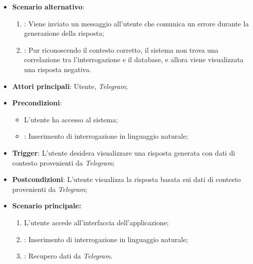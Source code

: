 \begin{itemize}
\begin{itemize}
    \end{itemize}
    \item \textbf{Scenario alternativo}:
    \begin{enumerate}
        \item {}: Viene inviato un messaggio all'utente che comunica un errore durante la generazione della risposta;
        \item {}: Pur riconoscendo il contesto corretto, il sistema non trova una correlazione tra l'interrogazione e il database, e allora viene visualizzata una risposta negativa.
    \end{enumerate}
\end{itemize}

\hypertarget{UC10.1}{}
\begin{itemize}
    \item \textbf{Attori principali}: Utente, \emph{Telegram};
    \item \textbf{Precondizioni}: 
    \begin{itemize}
        \item L'utente ha accesso al sistema;
        \item {}: Inserimento di interrogazione in linguaggio naturale;
    \end{itemize}
    \item \textbf{Trigger}: L'utente desidera visualizzare una risposta generata con dati di contesto provenienti da \emph{Telegram};
    \item \textbf{Postcondizioni}: L'utente visualizza la risposta basata sui dati di contesto provenienti da \emph{Telegram};
    \item \textbf{Scenario principale:}
    \begin{enumerate}
        \item L'utente accede all'interfaccia dell'applicazione;
        \item {}: Inserimento di interrogazione in linguaggio naturale;
        \item {}: Recupero dati da \emph{Telegram}.
    \end{enumerate}
\end{itemize}

